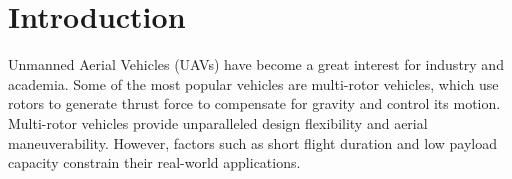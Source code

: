 \documentclass[conference]{ieeeconf}
\newcommand{\jiawei}[1]{{\color{orange}#1}}
\begin{document}
\section{Introduction}
Unmanned Aerial Vehicles (UAVs) have become a great interest for industry and academia. Some of the most popular vehicles are multi-rotor vehicles, which use rotors to generate thrust force to compensate for gravity and control its motion. Multi-rotor vehicles provide unparalleled design flexibility and aerial maneuverability. However, factors such as short flight duration and low payload capacity constrain their real-world applications.

%
\end{document}
